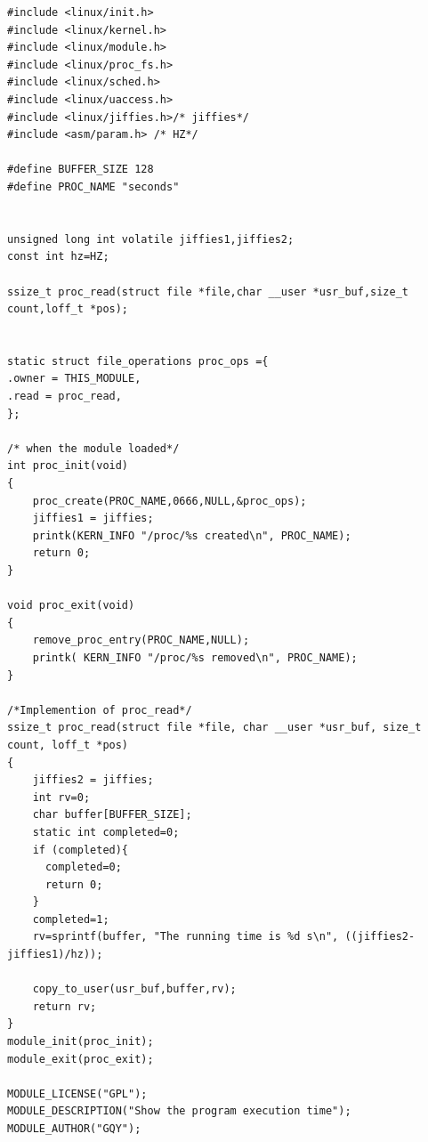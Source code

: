 \documentclass{article}
\begin{document}
\begin{lstlisting}[language={[ANSI]C}]
#include <linux/init.h>
#include <linux/kernel.h>
#include <linux/module.h>
#include <linux/proc_fs.h>
#include <linux/sched.h>
#include <linux/uaccess.h>
#include <linux/jiffies.h>/* jiffies*/
#include <asm/param.h> /* HZ*/

#define BUFFER_SIZE 128
#define PROC_NAME "seconds"


unsigned long int volatile jiffies1,jiffies2;
const int hz=HZ;

ssize_t proc_read(struct file *file,char __user *usr_buf,size_t count,loff_t *pos);


static struct file_operations proc_ops ={
.owner = THIS_MODULE,
.read = proc_read,   
};

/* when the module loaded*/
int proc_init(void)
{
    proc_create(PROC_NAME,0666,NULL,&proc_ops);
    jiffies1 = jiffies;  
    printk(KERN_INFO "/proc/%s created\n", PROC_NAME);
    return 0;
}

void proc_exit(void)
{
    remove_proc_entry(PROC_NAME,NULL);
    printk( KERN_INFO "/proc/%s removed\n", PROC_NAME);
}

/*Implemention of proc_read*/
ssize_t proc_read(struct file *file, char __user *usr_buf, size_t count, loff_t *pos)
{
	jiffies2 = jiffies;  
    int rv=0;
    char buffer[BUFFER_SIZE];
    static int completed=0;
    if (completed){
      completed=0;
      return 0; 
    }
    completed=1;
    rv=sprintf(buffer, "The running time is %d s\n", ((jiffies2-jiffies1)/hz));
 
    copy_to_user(usr_buf,buffer,rv);
    return rv;
}
module_init(proc_init);
module_exit(proc_exit);

MODULE_LICENSE("GPL");
MODULE_DESCRIPTION("Show the program execution time");
MODULE_AUTHOR("GQY");

\end{lstlisting}
\end{document}
